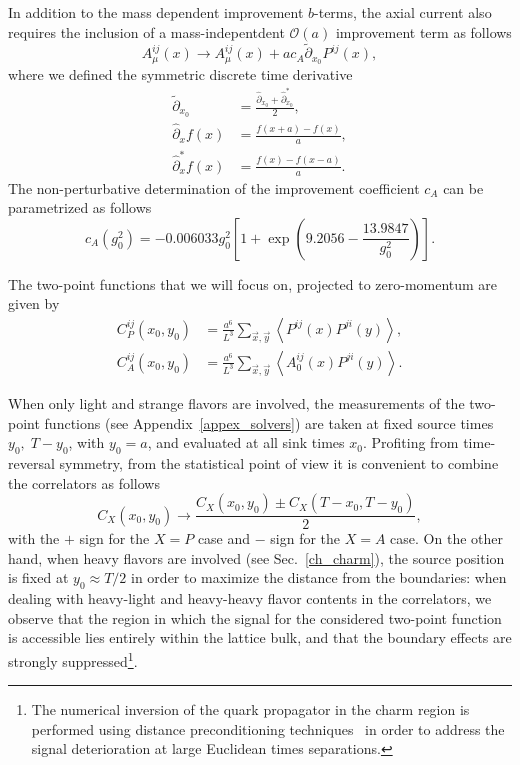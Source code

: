 In addition to the mass dependent improvement $b$-terms, the axial current also requires the inclusion of a mass-indepentdent $\mathcal{O}(a)$ improvement term as follows
\begin{equation}
\label{ch_observables:eq:axial_impr}
A_{\mu}^{ij}(x)\rightarrow A_{\mu}^{ij}(x)+ac_A\tilde{\partial}_{x_0}P^{ij}(x),
\end{equation}
where we defined the symmetric discrete time derivative
\begin{align}
\tilde{\partial}_{x_0}&=\frac{\hat{\partial}_{x_0}+\hat{\partial}_{x_0}^*}{2},\\
\hat{\partial}_{x}f(x)&=\frac{f(x+a)-f(x)}{a},\\
\hat{\partial}^*_{x}f(x)&=\frac{f(x)-f(x-a)}{a}.
\end{align}
The non-perturbative determination of the improvement coefficient $c_A$ can be parametrized as follows ~\citep{Bulava:2015bxa}
\begin{equation}
c_A(g_0^2)=-0.006033g_0^2\left[1+\exp\left(9.2056-\frac{13.9847}{g_0^2}\right)\right].
\end{equation}

The two-point functions that we will focus on, projected to zero-momentum are given by
\begin{align}
\label{ch_observables:eq:corrs}
C_P^{ij}(x_0,y_0)&=\frac{a^6}{L^3}\sum_{\vec{x},\vec{y}}\left<P^{ij}(x)P^{ji}(y)\right>,\\
C_A^{ij}(x_0,y_0)&=\frac{a^6}{L^3}\sum_{\vec{x},\vec{y}}\left<A_0^{ij}(x)P^{ji}(y)\right>.
\end{align}

When only light and strange flavors are involved, the measurements of the two-point functions (see Appendix~\ref{appex_solvers}) are taken at fixed source times $y_0,\;T-y_0$, with $y_0=a$, and evaluated at all sink times $x_0$. Profiting from time-reversal symmetry, from the statistical point of view it is convenient to combine the correlators as follows
\begin{equation}
C_X(x_0,y_0)\to\frac{C_X(x_0,y_0)\pm C_X(T-x_0,T-y_0)}{2},
\end{equation}
with the $+$ sign for the $X=P$ case and $-$ sign for the $X=A$ case. On the other hand, when heavy flavors are involved (see Sec.~\ref{ch_charm}), the source position is fixed at $y_0\approx T/2$ in order to maximize the distance from the boundaries: when dealing with heavy-light and heavy-heavy flavor contents in the correlators, we observe that the region in which the signal for the considered two-point function is accessible lies entirely within the lattice bulk, and that the boundary effects are strongly suppressed\footnote{The numerical inversion of the quark propagator in the charm region is performed using distance preconditioning techniques~\cite{deDivitiis:2010ya,Collins:2017iud} in order to address  the signal deterioration at large Euclidean times separations.}.

